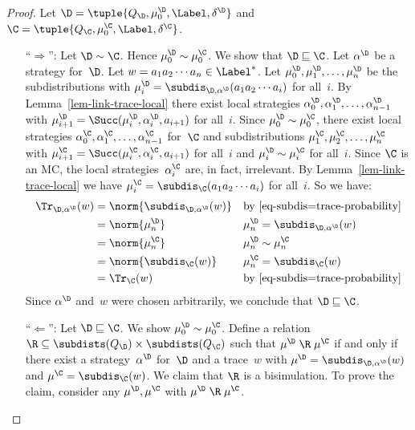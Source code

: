 \begin{proof}
Let $\D = \tuple{Q_\D,\mu^{\D}_{0},\Label,\delta^{\D}}$ and $\C = \tuple{Q_\C,\mu^{\C}_{0},\Label,\delta^{\C}}$.
\begin{itemize}[align=left]
\item[``$\Longrightarrow$'':]
Let $\D \sim \C$.
Hence $\mu^{\D}_{0} \sim \mu^{\C}_{0}$.
We show that $\D \sqsubseteq \C$.
Let $\alpha^{\D}$ be a strategy for~$\D$.
Let $w = a_1 a_2 \cdots a_n \in \Label^*$.
Let $\mu^{\D}_{0}, \mu^{\D}_{1}, \ldots, \mu^{\D}_{n}$ be the subdistributions with
 $\mu^{\D}_{i} = \subdis_{\D,\alpha^{\D}}(a_1 a_2 \cdots a_i)$ for all~$i$.
By Lemma~\ref{lem-link-trace-local} there exist local strategies $\alpha^{\D}_0, \alpha^{\D}_1, \ldots, \alpha^{\D}_{n-1}$ with
$\mu^{\D}_{i+1} = \Succ(\mu^{\D}_{i}, \alpha^{\D}_i, a_{i+1})$ for all~$i$.
Since $\mu^{\D}_{0} \sim \mu^{\C}_{0}$,
there exist local strategies $\alpha^{\C}_0, \alpha^{\C}_1, \ldots, \alpha^{\C}_{n-1}$ for~$\C$ and subdistributions $\mu^{\C}_1, \mu^{\C}_2, \ldots, \mu^{\C}_n$ with
$\mu^{\C}_{i+1} = \Succ(\mu^{\C}_{i}, \alpha^{\C}_i, a_{i+1})$ for all~$i$ and
$\mu^{\D}_i \sim \mu^{\C}_i$ for all~$i$.
Since $\C$ is an MC, the local strategies~$\alpha^{\C}_i$ are, in fact, irrelevant.
By Lemma~\ref{lem-link-trace-local} we have $\mu^{\C}_i = \subdis_{\C}(a_1 a_2 \cdots a_i)$ for all~$i$.
So we have:
\begin{align*}
\Tr_{\D,\alpha^{\D}}(w)
& = \norm{\subdis_{\D,\alpha^{\D}}(w)} && \text{by~\eqref{eq-subdis=trace-probability}} \\
& = \norm{\mu^{\D}_n} && \mu^{\D}_n = \subdis_{\D,\alpha^{\D}}(w) \\
& = \norm{\mu^{\C}_n} && \mu^{\D}_n \sim \mu^{\C}_n \\
& = \norm{\subdis_{\C}(w)} && \mu^{\C}_n = \subdis_{\C}(w) \\
& = \Tr_{\C}(w) && \text{by~\eqref{eq-subdis=trace-probability}}
\end{align*}
Since $\alpha^{\D}$ and~$w$ were chosen arbitrarily, we conclude that $\D \sqsubseteq \C$.
\item[``$\Longleftarrow$'':]
Let $\D \sqsubseteq \C$.
We show $\mu^{\D}_{0} \sim \mu^{\C}_{0}$.
Define a relation $\R \subseteq \subdists(Q_\D) \times \subdists(Q_\C)$
such that $\mu^{\D} \mathrel{\R} \mu^{\C}$ if and only if there exist a strategy~$\alpha^{\D}$ for~$\D$ and a trace~$w$ with
$\mu^{\D} = \subdis_{\D,\alpha^{\D}}(w)$ and $\mu^{\C} = \subdis_{\C}(w)$.
We claim that $\R$ is a bisimulation.
To prove the claim, consider any $\mu^{\D}, \mu^{\C}$ with $\mu^{\D} \mathrel{\R} \mu^{\C}$.

\end{itemize}
\end{proof}
